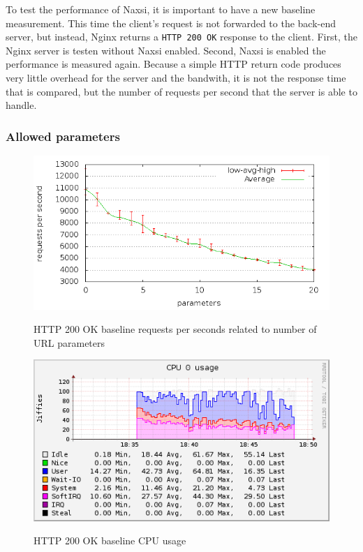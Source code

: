 \documentclass[Measurements]{subfiles}
\begin{document}
To test the performance of Naxsi, it is important to have a new baseline measurement. This time the client's request is not forwarded to the back-end server, but instead, Nginx returns a \verb+HTTP 200 OK+ response to the client. First, the Nginx server is testen without Naxsi enabled. Second, Naxsi is enabled the performance is measured again. Because a simple HTTP return code produces very little overhead for the server and the bandwith, it is not the response time that is compared, but the number of requests per second that the server is able to handle.

\subsubsection{Allowed parameters}

\begin{figure}[H]
\caption{HTTP 200 OK baseline requests per seconds related to number of URL parameters}
\centering
\includegraphics[scale=0.55] {images/results/200_with_naxsi_incremented_allowed_parameters/output.png}
\label{fig:Baseline performance measurement}
\end{figure}

\begin{figure}[H]
\centering
\caption{HTTP 200 OK baseline CPU usage}
\includegraphics[scale=0.7]{images/results/200_with_naxsi_incremented_allowed_parameters/cpu.png}
\label{fig:Baseline Nginx CPU usage}
\end{figure}
\end{document}
